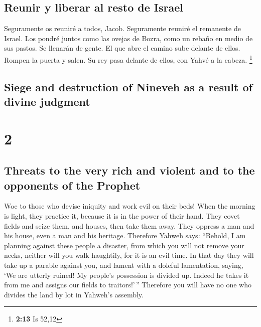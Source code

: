 \begin{paracol}{2}
\hypertarget{reunir-y-liberar-al-resto-de-israel}{%
\subsection{Reunir y liberar al resto de
Israel}\label{reunir-y-liberar-al-resto-de-israel}}

 Seguramente os reuniré a todos, Jacob. Seguramente
reuniré el remanente de Israel. Los pondré juntos como las ovejas de
Bozra, como un rebaño en medio de sus pastos. Se llenarán de gente.
 El que abre el camino sube delante de ellos. Rompen la
puerta y salen. Su rey pasa delante de ellos, con Yahvé a la cabeza.
\footnote{\textbf{2:13} Is 52,12}

\switchcolumn
\begin{otherlanguage}{english}

\hypertarget{siege-and-destruction-of-nineveh-as-a-result-of-divine-judgment}{%
\subsection{Siege and destruction of Nineveh as a result of divine
judgment}\label{siege-and-destruction-of-nineveh-as-a-result-of-divine-judgment}}

\hypertarget{section-3}{%
\section{2}\label{section-3}}

\hypertarget{threats-to-the-very-rich-and-violent-and-to-the-opponents-of-the-prophet}{%
\subsection{Threats to the very rich and violent and to the opponents of
the
Prophet}\label{threats-to-the-very-rich-and-violent-and-to-the-opponents-of-the-prophet}}

 Woe to those who devise iniquity and work evil on their
beds! When the morning is light, they practice it, because it is in the
power of their hand.  They covet fields and seize them,
and houses, then take them away. They oppress a man and his house, even
a man and his heritage.  Therefore Yahweh says: ``Behold,
I am planning against these people a disaster, from which you will not
remove your necks, neither will you walk haughtily, for it is an evil
time.  In that day they will take up a parable against
you, and lament with a doleful lamentation, saying, `We are utterly
ruined! My people's possession is divided up. Indeed he takes it from me
and assigns our fields to traitors!'\,''  Therefore you
will have no one who divides the land by lot in Yahweh's assembly.


\end{otherlanguage}
\end{paracol}
